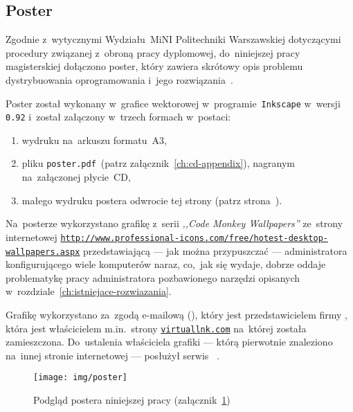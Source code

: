 \documentclass[thesis]{subfiles}
\begin{document}
\begin{appendices}
\chapter{Poster}
\label{ch:poster}

Zgodnie z~wytycznymi Wydziału~MiNI Politechniki Warszawskiej dotyczącymi procedury związanej z~obroną pracy dyplomowej, do~niniejszej pracy magisterskiej dołączono poster, który zawiera skrótowy opis problemu dystrybuowania oprogramowania i~jego rozwiązania~\cite{informacje-dot-obron}.

Poster został wykonany w~grafice wektorowej w~programie~\texttt{Inkscape} w~wersji \texttt{0.92} i~został załączony w~trzech formach w~postaci:
\begin{enumerate}
	\item wydruku na~arkuszu formatu~A3,
	\item pliku \mbox{\texttt{poster.pdf}}~(patrz załącznik~\ref{ch:cd-appendix}), nagranym na~załączonej płycie~CD,
	\item małego wydruku postera odwrocie tej strony (patrz strona~\pageref{fig:poster-preview}).
\end{enumerate}
Na~posterze wykorzystano grafikę z~serii \emph{,,Code Monkey Wallpapers''} ze~strony internetowej \texttt{\url{http://www.professional-icons.com/free/hotest-desktop-wallpapers.aspx}} przedstawiającą --- jak można przypuszczać --- administratora konfigurującego wiele komputerów naraz, co,~jak się wydaje, dobrze oddaje problematykę pracy administratora pozbawionego narzędzi opisanych w~rozdziale~\ref{ch:istniejace-rozwiazania}.

Grafikę wykorzystano za~zgodą e-mailową  (), który jest przedstawicielem firmy , która jest właścicielem m.in.~strony \texttt{\url{virtuallnk.com}} na~której została zamieszczona. Do~ustalenia właściciela grafiki --- którą pierwotnie znaleziono na~innej stronie internetowej --- posłużył serwis ~\cite{tineye}.

\newpage
\begin{figure}[p]
	\centering
	\texttt{[image: img/poster]}
	\caption{Podgląd postera niniejszej pracy (załącznik~\ref{ch:poster})}
	\label{fig:poster-preview}
\end{figure}


\end{appendices}
\end{document}
